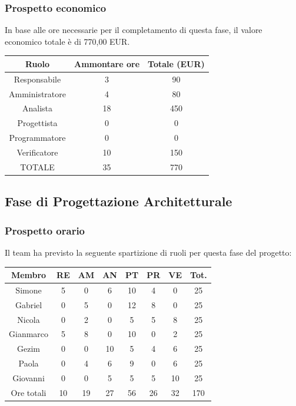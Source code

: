 \subsubsection{Prospetto economico}
In base alle ore necessarie per il completamento di questa fase, il valore economico totale è di 770,00 EUR.
\begin{center}
\begin{tabular}{ |c|c|c|  }
 \hline
 Ruolo 		& Ammontare ore 	& Totale (EUR)\\
 	\hline
 \hline
 	Responsabile	& 3 		& 90\\
	Amministratore	& 4		& 80\\
	Analista		& 18 	& 450\\
	Progettista		& 0		& 0\\
	Programmatore	& 0		& 0\\
	Verificatore	& 10		& 150\\
 \hline\hline
 TOTALE		& 35		& 770\\
  \hline
\end{tabular}
\end{center}
\newpage
\subsection{Fase di Progettazione Architetturale}
\subsubsection{Prospetto orario}
Il team ha previsto la seguente spartizione di ruoli per questa fase del progetto:
\\
\begin{center}
\begin{tabular}{ |c|c|c|c|c|c|c|c|  }
 \hline
 Membro 		& RE 	& AM 	& AN 	& PT 	& PR 	& VE 	& Tot.\\
 \hline\hline
 Simone			& 5 		& 0		& 6 	& 10 	& 4 		& 0 		& 25\\
 Gabriel		& 0 		& 5 		& 0 	& 12		& 8 		& 0 		& 25\\
 Nicola			& 0 		& 2 		& 0 	& 5 		& 5 		& 8 		& 25\\
 Gianmarco		& 5 		& 8 		& 0 	& 10 	& 0 		& 2 		& 25\\
 Gezim			& 0 		& 0 		& 10 	& 5 		& 4 		& 6	 	& 25\\
 Paola			& 0 		& 4 		& 6 	& 9 		& 0 		& 6 		& 25\\
 Giovanni		& 0 		& 0	 	& 5 	& 5 		& 5 		& 10  	& 25\\
 \hline\hline
 Ore totali		& 10		& 19		& 27 	& 56	 	& 26 	& 32 	& 170\\
  \hline
\end{tabular}
\end{center}

